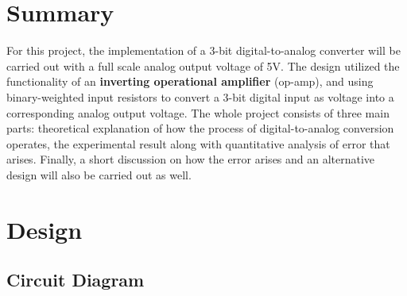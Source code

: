 \documentclass[12pt]{article}
\begin{document}
    \section{Summary}

    For this project, the implementation of a 3-bit digital-to-analog converter will be carried out with a full scale analog output voltage of 5V. The design utilized the functionality of an \textbf{inverting operational amplifier} (op-amp), and using binary-weighted input resistors to convert a 3-bit digital input as voltage into a corresponding analog output voltage. The whole project consists of three main parts: theoretical explanation of how the process of digital-to-analog conversion operates, the experimental result along with quantitative analysis of error that arises. Finally, a short discussion on how the error arises and an alternative design will also be carried out as well. 

    
    \section{Design}
    \subsection{Circuit Diagram}
\end{document}
